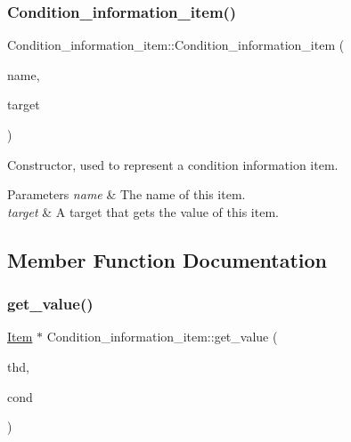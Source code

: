 \subsubsection{\texorpdfstring{Condition\+\_\+information\+\_\+item()}{Condition\_information\_item()}}
{\footnotesize\ttfamily Condition\+\_\+information\+\_\+item\+::\+Condition\+\_\+information\+\_\+item (\begin{DoxyParamCaption}\item[{\mbox{\hyperlink{classCondition__information__item_aa66f80b798aacf01030f1e8a755e9267}{Name}}}]{name,  }\item[{\mbox{\hyperlink{classItem}{Item}} $\ast$}]{target }\end{DoxyParamCaption})\hspace{0.3cm}{\ttfamily [inline]}}

Constructor, used to represent a condition information item.


\begin{DoxyParams}{Parameters}
{\em name} & The name of this item. \\
\hline
{\em target} & A target that gets the value of this item. \\
\hline
\end{DoxyParams}


\subsection{Member Function Documentation}
\mbox{\label{classCondition__information__item_a91dc6276a53028518e01554fcfde96df}} 
\subsubsection{\texorpdfstring{get\+\_\+value()}{get\_value()}}
{\footnotesize\ttfamily \mbox{\hyperlink{classItem}{Item}} $\ast$ Condition\+\_\+information\+\_\+item\+::get\+\_\+value (\begin{DoxyParamCaption}\item[{T\+HD $\ast$}]{thd,  }\item[{const \mbox{\hyperlink{classSql__condition}{Sql\+\_\+condition}} $\ast$}]{cond }\end{DoxyParamCaption})}

